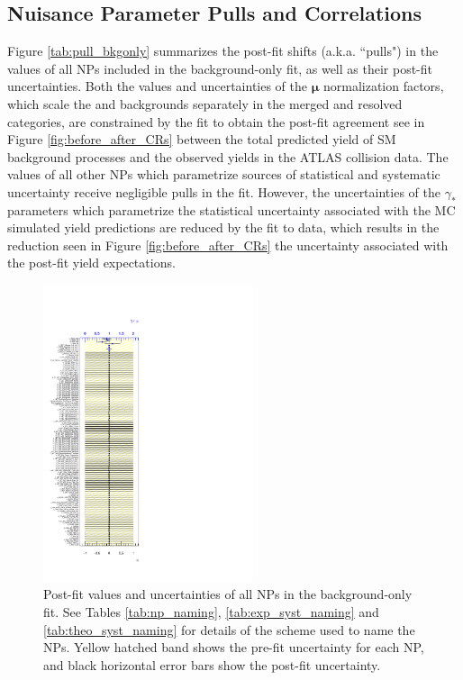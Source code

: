 \subsection{Nuisance Parameter Pulls and Correlations}

Figure \ref{tab:pull_bkgonly} summarizes the post-fit shifts (a.k.a. ``pulls") in the values of all NPs included in the background-only fit, as well as their post-fit uncertainties. Both the values and uncertainties of the \(\boldsymbol{\mu}\) normalization factors, which scale the \wjets and \ttbar backgrounds separately in the merged and resolved categories, are constrained by the fit to obtain the post-fit agreement see in Figure \ref{fig:before_after_CRs} between the total predicted yield of SM background processes and the observed yields in the ATLAS collision data. The values of all other NPs which parametrize sources of statistical and systematic uncertainty receive negligible pulls in the fit. However, the uncertainties of the \(\gamma_*\) parameters which parametrize the statistical uncertainty associated with the MC simulated yield predictions are reduced by the fit to data,  which results in the reduction seen in Figure \ref{fig:before_after_CRs} the uncertainty associated with the post-fit yield expectations.

\begin{figure}[h]
  \centering
  \includegraphics[width=0.55\textwidth]{Figures/8/BkgOnly/fit_parameters.pdf}
  \caption[Pull plots for background-only fit]{\footnotesize{Post-fit values and uncertainties of all NPs in the background-only fit. See Tables \ref{tab:np_naming}, \ref{tab:exp_syst_naming} and \ref{tab:theo_syst_naming} for details of the scheme used to name the NPs. Yellow hatched band shows the pre-fit uncertainty for each NP, and black horizontal error bars show the post-fit uncertainty.}}
  \label{fig:pull_bkgonly}
\end{figure}

